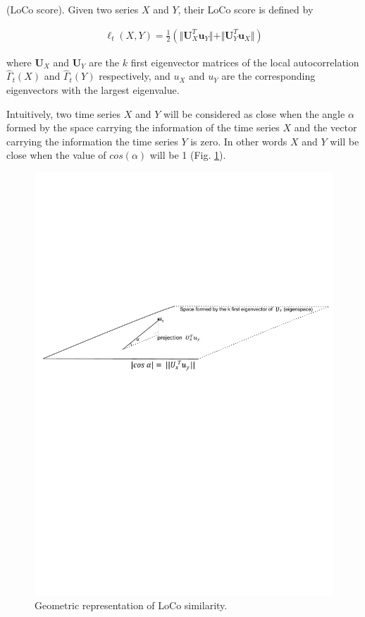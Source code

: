 \begin{definition}
\label{score}
(LoCo score). Given two series $X$ and $Y$, their LoCo score is defined by

\begin{eqnarray}
\ell_{t}(X,Y)=\frac{1}{2}(\Vert
\boldsymbol{U}_{X}^{T}\boldsymbol{u}_{Y}\Vert+\Vert
\boldsymbol{U}_{Y}^{T}\boldsymbol{u}_{X}\Vert)
\end{eqnarray}

\end{definition}    


where $\boldsymbol{U}_X$ and  $\boldsymbol{U}_Y$ are the $k$ first eigenvector
matrices of the local autocorrelation $\hat{\Gamma}_{t}(X)$ and
$\hat{\Gamma}_{t}(Y)$ respectively, and $u_X$  and $u_Y$  are the
corresponding eigenvectors with the largest eigenvalue. 


Intuitively, two time series $X$ and $Y$ will be considered as close when the angle
$\alpha$ formed by the space carrying the information of the time series $X$ and
the vector carrying the information the time series $Y$ is zero. In other words $X$
and $Y$ will be close when the value of  $cos(\alpha)$ will be 1 (Fig. \ref{geoLoco}). 

\begin{figure}[h]
\centering
 \includegraphics[scale=0.70]{images/loco2}
\caption{Geometric representation of LoCo similarity.}
\label{geoLoco}
\end{figure}



